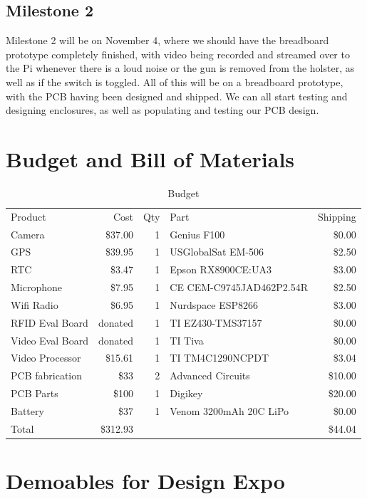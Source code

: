 \documentclass[12pt]{article}
\begin{document}
\subsection{Milestone 2}

Milestone 2 will be on November 4, where we should have the breadboard
prototype completely finished, with video being recorded and streamed over to
the Pi whenever there is a loud noise or the gun is removed from the holster,
as well as if the switch is toggled. All of this will be on a breadboard
prototype, with the PCB having been designed and shipped.  We can all start
testing and designing enclosures, as well as populating and testing our PCB
design.

\section{Budget and Bill of Materials}

\begin{table}[h!]
    \centering
    \caption{Budget}
    \begin{tabular}{lrrlr}
        Product & Cost & Qty & Part & Shipping\\
        Camera & \$37.00 & 1 & Genius F100 & \$0.00\\
        GPS & \$39.95 & 1 & USGlobalSat EM-506 & \$2.50\\
        RTC & \$3.47 & 1 & Epson RX8900CE:UA3 & \$3.00\\
        Microphone & \$7.95 & 1 & CE CEM-C9745JAD462P2.54R & \$2.50\\
        Wifi Radio & \$6.95 & 1 & Nurdspace ESP8266 & \$3.00\\
        RFID Eval Board & donated & 1 & TI EZ430-TMS37157 & \$0.00\\
        Video Eval Board & donated & 1 & TI Tiva & \$0.00\\
        Video Processor & \$15.61 & 1 & TI TM4C1290NCPDT & \$3.04\\
        PCB fabrication & \$33 & 2 & Advanced Circuits & \$10.00\\
        PCB Parts & \$100 & 1 & Digikey & \$20.00\\
        Battery & \$37 & 1 & Venom 3200mAh 20C LiPo & \$0.00\\
        Total & \$312.93 & & & \$44.04\\
    \end{tabular}
\end{table}

\section{Demoables for Design Expo}
\end{document}

